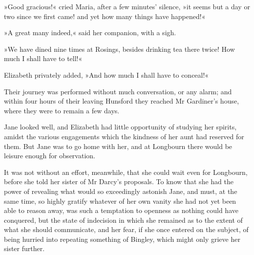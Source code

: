 »Good gracious!« cried Maria, after a few minutes' silence, »it seems but a day or two since we first came! and yet how many things have happened!«

»A great many indeed,« said her companion, with a sigh.

»We have dined nine times at Rosings, besides drinking tea there twice! How much I shall have to tell!«

Elizabeth privately added, »And how much I shall have to conceal!«

Their journey was performed without much conversation, or any alarm; and within four hours of their leaving Hunsford they reached Mr Gardiner's house, where they were to remain a few days.

Jane looked well, and Elizabeth had little opportunity of studying her spirits, amidst the various engagements which the kindness of her aunt had reserved for them. But Jane was to go home with her, and at Longbourn there would be leisure enough for observation.

It was not without an effort, meanwhile, that she could wait even for Longbourn, before she told her sister of Mr Darcy's proposals. To know that she had the power of revealing what would so exceedingly astonish Jane, and must, at the same time, so highly gratify whatever of her own vanity she had not yet been able to reason away, was such a temptation to openness as nothing could have conquered, but the state of indecision in which she remained as to the extent of what she should communicate, and her fear, if she once entered on the subject, of being hurried into repeating something of Bingley, which might only grieve her sister further.